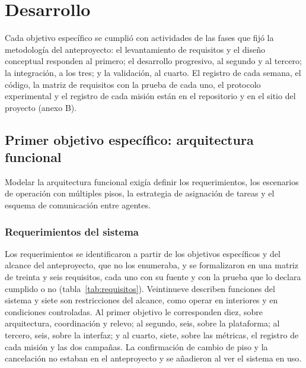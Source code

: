 \chapter{Desarrollo}
\label{cap:desarrollo}

Cada objetivo específico se cumplió con actividades de las fases que fijó la metodología del anteproyecto: el levantamiento de requisitos y el diseño conceptual responden al primero; el desarrollo progresivo, al segundo y al tercero; la integración, a los tres; y la validación, al cuarto. El registro de cada semana, el código, la matriz de requisitos con la prueba de cada uno, el protocolo experimental y el registro de cada misión están en el repositorio y en el sitio del proyecto (anexo B).

\section{Primer objetivo específico: arquitectura funcional}
\label{sec:oe1}

Modelar la arquitectura funcional exigía definir los requerimientos, los escenarios de operación con múltiples pisos, la estrategia de asignación de tareas y el esquema de comunicación entre agentes.

\subsection{Requerimientos del sistema}

Los requerimientos se identificaron a partir de los objetivos específicos y del alcance del anteproyecto, que no los enumeraba, y se formalizaron en una matriz de treinta y seis requisitos, cada uno con su fuente y con la prueba que lo declara cumplido o no (tabla~\ref{tab:requisitos}). Veintinueve describen funciones del sistema y siete son restricciones del alcance, como operar en interiores y en condiciones controladas. Al primer objetivo le corresponden diez, sobre arquitectura, coordinación y relevo; al segundo, seis, sobre la plataforma; al tercero, seis, sobre la interfaz; y al cuarto, siete, sobre las métricas, el registro de cada misión y las dos campañas. La confirmación de cambio de piso y la cancelación no estaban en el anteproyecto y se añadieron al ver el sistema en uso.

